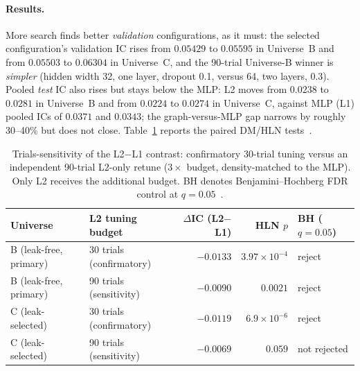 \documentclass{article}
\begin{document}
\paragraph{Results.}
More search finds better \emph{validation} configurations, as it must: the
selected configuration's validation IC rises from $0.05429$ to $0.05595$ in
Universe~B and from $0.05503$ to $0.06304$ in Universe~C, and the 90-trial
Universe-B winner is \emph{simpler} (hidden width 32, one layer, dropout 0.1,
versus 64, two layers, 0.3). Pooled \emph{test} IC also rises but stays below the
MLP: L2 moves from $0.0238$ to $0.0281$ in Universe~B and from $0.0224$ to
$0.0274$ in Universe~C, against MLP (L1) pooled ICs of $0.0371$ and $0.0343$; the
graph-versus-MLP gap narrows by roughly 30--40\% but does not close.
Table~\ref{app:robust:tab-trials} reports the paired DM/HLN
tests~\citep{diebold1995comparing,harvey1997testing}.

\begin{table}[h]
  \centering
  \caption{Trials-sensitivity of the L2$-$L1 contrast: confirmatory 30-trial
  tuning versus an independent 90-trial L2-only retune ($3\times$ budget,
  density-matched to the MLP). Only L2 receives the additional budget. BH denotes
  Benjamini--Hochberg FDR control at $q=0.05$~\citep{benjamini1995controlling}.}
  \label{app:robust:tab-trials}
  \begin{tabular}{@{}llrrl@{}}
    \toprule
    Universe & L2 tuning budget & $\Delta$IC (L2$-$L1) & HLN $p$ & BH ($q=0.05$) \\
    \midrule
    B (leak-free, primary) & 30 trials (confirmatory) & $-0.0133$ & $3.97\times10^{-4}$ & reject \\
    B (leak-free, primary) & 90 trials (sensitivity)  & $-0.0090$ & $0.0021$            & reject \\
    C (leak-selected)      & 30 trials (confirmatory) & $-0.0119$ & $6.9\times10^{-6}$  & reject \\
    C (leak-selected)      & 90 trials (sensitivity)  & $-0.0069$ & $0.059$             & not rejected \\
    \bottomrule
  \end{tabular}
\end{table}
\end{document}
